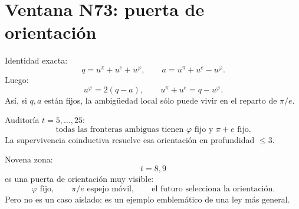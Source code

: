 
\section*{Ventana N73: puerta de orientación}
Identidad exacta:
\[
q=u^\pi+u^e+u^\varphi,\qquad
a=u^\pi+u^e-u^\varphi.
\]
Luego:
\[
\boxed{u^\varphi=2(q-a),\qquad u^\pi+u^e=q-u^\varphi.}
\]
Así, si \(q,a\) están fijos, la ambigüedad local sólo puede vivir en el reparto de \(\pi/e\).

Auditoría \(t=5,\ldots,25\):
\[
\boxed{\text{todas las fronteras ambiguas tienen }\varphi\text{ fijo y }\pi+e\text{ fijo.}}
\]
La supervivencia coinductiva resuelve esa orientación en profundidad \(\le3\).

Novena zona:
\[
t=8,9
\]
es una puerta de orientación muy visible:
\[
\varphi\text{ fijo},\qquad \pi/e\text{ espejo móvil},\qquad \text{el futuro selecciona la orientación.}
\]
Pero no es un caso aislado: es un ejemplo emblemático de una ley más general.

